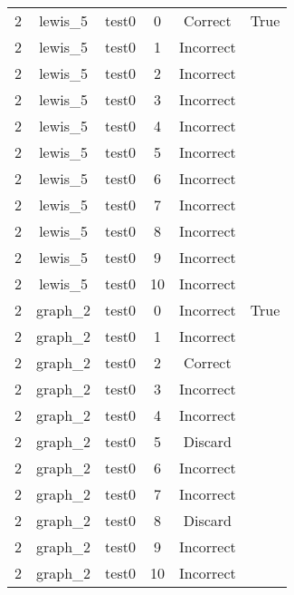 \begin{longtable}{|c|c|c|c|c|c|}
2 & lewis\_5 & test0 & 0 & Correct & True \\ 
2 & lewis\_5 & test0 & 1 & Incorrect &  \\ 
2 & lewis\_5 & test0 & 2 & Incorrect &  \\ 
2 & lewis\_5 & test0 & 3 & Incorrect &  \\ 
2 & lewis\_5 & test0 & 4 & Incorrect &  \\ 
2 & lewis\_5 & test0 & 5 & Incorrect &  \\ 
2 & lewis\_5 & test0 & 6 & Incorrect &  \\ 
2 & lewis\_5 & test0 & 7 & Incorrect &  \\ 
2 & lewis\_5 & test0 & 8 & Incorrect &  \\ 
2 & lewis\_5 & test0 & 9 & Incorrect &  \\ 
2 & lewis\_5 & test0 & 10 & Incorrect &  \\ 
2 & graph\_2 & test0 & 0 & Incorrect & True \\ 
2 & graph\_2 & test0 & 1 & Incorrect &  \\ 
2 & graph\_2 & test0 & 2 & Correct &  \\ 
2 & graph\_2 & test0 & 3 & Incorrect &  \\ 
2 & graph\_2 & test0 & 4 & Incorrect &  \\ 
2 & graph\_2 & test0 & 5 & Discard &  \\ 
2 & graph\_2 & test0 & 6 & Incorrect &  \\ 
2 & graph\_2 & test0 & 7 & Incorrect &  \\ 
2 & graph\_2 & test0 & 8 & Discard &  \\ 
2 & graph\_2 & test0 & 9 & Incorrect &  \\ 
2 & graph\_2 & test0 & 10 & Incorrect &  \\ 

\end{longtable}